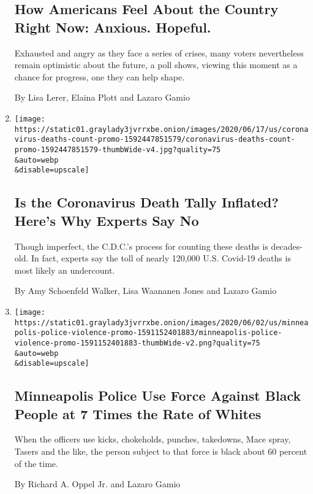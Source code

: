 \begin{enumerate}
{  \subsection{How Americans Feel About the Country Right Now: Anxious.
  Hopeful.}\label{how-americans-feel-about-the-country-right-now-anxious-hopeful}}

  Exhausted and angry as they face a series of crises, many voters
  nevertheless remain optimistic about the future, a poll shows, viewing
  this moment as a chance for progress, one they can help shape.

  By Lisa Lerer, Elaina Plott and Lazaro Gamio
\item
  \href{/interactive/2020/06/19/us/us-coronavirus-covid-death-toll.html}{}

  \texttt{[image: https://static01.graylady3jvrrxbe.onion/images/2020/06/17/us/coronavirus-deaths-count-promo-1592447851579/coronavirus-deaths-count-promo-1592447851579-thumbWide-v4.jpg?quality=75\\\&auto=webp\\\&disable=upscale]}

  \hypertarget{is-the-coronavirus-death-tally-inflated-heres-why-experts-say-no}{%
  \subsection{Is the Coronavirus Death Tally Inflated? Here's Why
  Experts Say
  No}\label{is-the-coronavirus-death-tally-inflated-heres-why-experts-say-no}}

  Though imperfect, the C.D.C.'s process for counting these deaths is
  decades-old. In fact, experts say the toll of nearly 120,000 U.S.
  Covid-19 deaths is most likely an undercount.

  By Amy Schoenfeld Walker, Lisa Waananen Jones and Lazaro Gamio
\item
  \href{/interactive/2020/06/03/us/minneapolis-police-use-of-force.html}{}

  \texttt{[image: https://static01.graylady3jvrrxbe.onion/images/2020/06/02/us/minneapolis-police-violence-promo-1591152401883/minneapolis-police-violence-promo-1591152401883-thumbWide-v2.png?quality=75\\\&auto=webp\\\&disable=upscale]}

  \hypertarget{minneapolis-police-use-force-against-black-people-at-7-times-the-rate-of-whites}{%
  \subsection{Minneapolis Police Use Force Against Black People at 7
  Times the Rate of
  Whites}\label{minneapolis-police-use-force-against-black-people-at-7-times-the-rate-of-whites}}

  When the officers use kicks, chokeholds, punches, takedowns, Mace
  spray, Tasers and the like, the person subject to that force is black
  about 60 percent of the time.

  By Richard A. Oppel Jr. and Lazaro Gamio
\end{enumerate}

